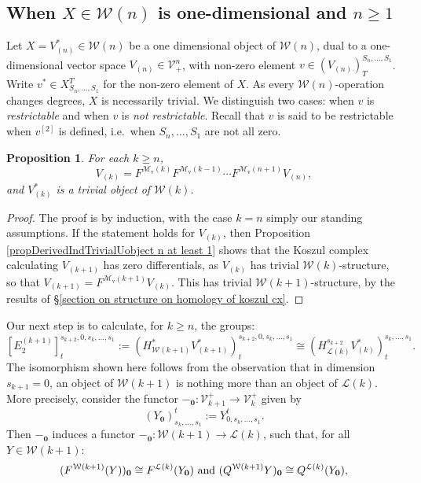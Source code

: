 \documentclass[11pt]{amsart} \renewcommand{\baselinestretch}{1.2}
\theoremstyle{plain}
\newtheorem{prop}[thm]{Proposition}
\theoremstyle{definition}
\newcommand{\DASH}{\mathrm{-}}
\renewcommand{\to}{\longrightarrow}
\newcommand{\calL}{\mathcal{L}}
\newcommand{\calV}{\mathcal{V}}
\newcommand{\calw}{\mathcal{W}}
\newcommand{\calMv}{\mathcal{M}\dver}
\newcommand{\restn}[1]{#1^{[2]}}
\newcommand{\vect}[2]{\calV^{#1}_{#2}}
\newcommand{\E}[5]{[E^{#1}_{#2}#3]^{#4}_{#5}}
\newcommand{\dver}{_\mathrm{v}}
\begin{document}
\begin{Calculations of HWn}
\subsection{When $X\in\calw(n)$ is one-dimensional and $n\geq1$}
\label{one-dimensional, n geq1}
Let $X=V^*_{(n)}\in\calw(n)$ be a one dimensional object of $\calw(n)$, %
dual to a one-dimensional vector space $V_{(n)}\in\vect{n}{+}$, with non-zero element $v\in(V_{(n)})^{S_n,\ldots,S_1}_T$. Write $v^*\in X^T_{S_n,\ldots,S_1}$ for the non-zero element of $X$. As every $\calw(n)$-operation changes degrees, $X$ is necessarily trivial. We distinguish two cases: when $v$ is \emph{restrictable} and when $v$ is \emph{not restrictable}. Recall that $v$ is said to be restrictable when $\restn{v}$ is defined, i.e.\ when $S_n,\ldots,S_1$ are not all zero.
\begin{prop}
\label{iterative calc of the Vk all trivial}
For each $k\geq n$,
\[V_{(k)}=F^{\calMv(k)}F^{\calMv(k-1)}\cdots F^{\calMv(n+1)}V_{(n)},\]
and $V^*_{(k)}$ is a trivial object of $\calw(k)$.
\end{prop}
\begin{proof}
The proof is by induction, with the case $k=n$ simply our standing assumptions. If the statement holds for $V_{(k)}$, then Proposition \ref{propDerivedIndTrivialUobject n at least 1} shows that the Koszul complex calculating $V_{(k+1)}$ has zero differentials, as $V_{(k)}$ has trivial $\calw(k)$-structure, so that $V_{(k+1)}=F^{\calMv(k+1)}V_{(k)}$. This has trivial $\calw(k+1)$-structure, by the results of \S\ref{section on structure on homology of koszul cx}.
\end{proof}
Our next step is to calculate, for $k\geq n$, the groups:
\[\E{(k+1)}{2}{}{s_{k+2},0,s_k,\ldots,s_1}{t}:=(H^*_{\calw(k+1)}V^*_{(k+1)})^{s_{k+2},0,s_k,\ldots,s_1}_{t}\cong (H^{s_{k+2}}_{\calL(k)}V^*_{(k)})^{s_k,\ldots,s_1}_{t}.\]
The isomorphism shown here follows from the observation that in dimension $s_{k+1}=0$, an object of $\calw(k+1)$ is nothing more than an object of $\calL(k)$. More precisely, consider the functor $\DASH_\textbf{0}:\vect{+}{k+1}\to \vect{+}{k}$ given by
\[(Y_\textbf{0})^t_{s_k,\ldots,s_1}:=Y^t_{0,s_k,\ldots,s_1}.\]
Then $\DASH_\textbf{0}$ induces a functor $\DASH_\textbf{0}:\calw(k+1)\to \calL(k)$, such that, for all $Y\in\calw(k+1)$:
\[(F^{\calw(k+1)}(Y))_\textbf{0}\cong F^{\calL(k)}(Y_\textbf{0})\textup{ and }(Q^{\calw(k+1)}Y)_\textbf{0}\cong Q^{\calL(k)}(Y_\textbf{0}),\]

\end{Calculations of HWn}
\end{document}
